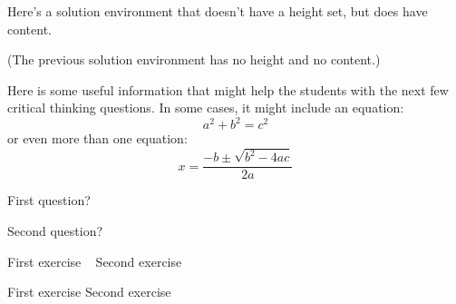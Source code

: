 \begin{activity}
\begin{ctqs}
		\begin{solution}
		
			Here's a solution environment that doesn't have a height set, but does have content.
			
			(The previous solution environment has no height and no content.)		
		
		\end{solution}
\end{ctqs}

		
\begin{infobox}
	Here is some useful information that might help the students with the next few critical thinking questions.
	In some cases, it might include an equation:
	\begin{equation*}
		a^2 + b^2 = c^2
	\end{equation*}
	or even more than one equation:
	\begin{equation*}
		x=\frac{-b \pm \sqrt{b^2-4ac}}{2a}
	\end{equation*}
\end{infobox}

\begin{ctqs}

	\question First question?
		\begin{solution}[1in]
		\end{solution}
	
	\question Second question?
		\begin{solution}[1in]
		\end{solution}
\end{ctqs}



\begin{exercises}

	\exercise First exercise ~
	\exercise Second exercise
	
\end{exercises}


\begin{problems}

	\problem First exercise
	\problem Second exercise
	
\end{problems}


	
\end{activity}
